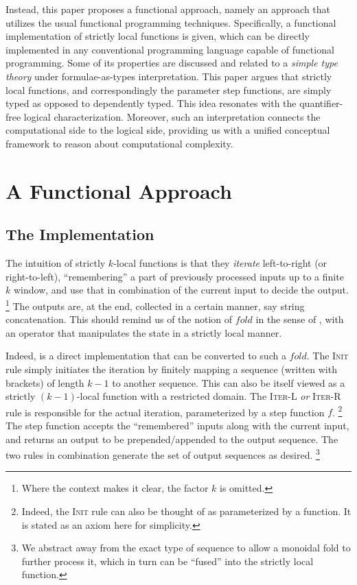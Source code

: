 \documentclass[11pt]{article}
\theoremstyle{definition}
\theoremstyle{plain}
\begin{document}
Instead, this paper proposes a functional approach, namely an approach
that utilizes the usual functional programming techniques.
Specifically, a functional implementation of strictly local functions
is given, which can be directly implemented in any conventional
programming language capable of functional programming.  Some of its
properties are discussed and related to a \emph{simple type theory}
under  formulae-as-types interpretation.  This paper
argues that strictly local functions, and correspondingly the
parameter step functions, are simply typed as opposed to dependently
typed.  This idea resonates with the quantifier-free logical
characterization.  Moreover, such an interpretation connects the
computational side to the logical side, providing us with a unified
conceptual framework to reason about computational complexity.

\section{A Functional Approach}
\subsection{The Implementation}
The intuition of strictly \(k\)-local functions is that they
\emph{iterate} left-to-right (or right-to-left), \enquote{remembering}
a part of previously processed inputs up to a finite \(k\) window, and
use that in combination of the current input to decide the output.%
\footnote{Where the context makes it clear, the factor \(k\) is
  omitted.}
%
The outputs are, at the end, collected in a certain manner, say string
concatenation.  This should remind us of the notion of
\(\mathit{fold}\) in the sense of \citet{h99tuemf}, with an operator
that manipulates the state in a strictly local manner.

Indeed,  is a direct implementation that can
be converted to such a \(\mathit{fold}\).  The \textsc{Init} rule
simply initiates the iteration by finitely mapping a sequence (written
with brackets) of length \(k-1\) to another sequence.  This can also
be itself viewed as a strictly \((k-1)\)-local function with a
restricted domain.  The \textsc{Iter-L} \emph{or} \textsc{Iter-R} rule
is responsible for the actual iteration, parameterized by a step
function \(f\).%
\footnote{Indeed, the \textsc{Init} rule can also be thought of as
  parameterized by a function.  It is stated as an axiom here for
  simplicity.}
%
The step function accepts the \enquote{remembered} inputs along with
the current input, and returns an output to be prepended/appended to
the output sequence.  The two rules in combination generate the set of
output sequences as desired.%
\footnote{We abstract away from the exact type of sequence to allow a
  monoidal fold to further process it, which in turn can be
  \enquote{fused} into the strictly local function.}
\end{document}

